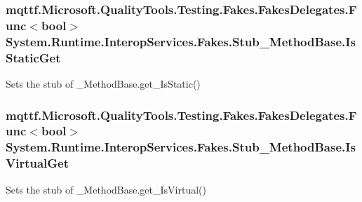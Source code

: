 \hypertarget{class_system_1_1_runtime_1_1_interop_services_1_1_fakes_1_1_stub___method_base_a9942d1453cbd6e098362d18e13d050f5}{
\subsubsection[{Is\-Static\-Get}]{\setlength{\rightskip}{0pt plus 5cm}mqttf.\-Microsoft.\-Quality\-Tools.\-Testing.\-Fakes.\-Fakes\-Delegates.\-Func$<$bool$>$ System.\-Runtime.\-Interop\-Services.\-Fakes.\-Stub\-\_\-\-Method\-Base.\-Is\-Static\-Get}}\label{class_system_1_1_runtime_1_1_interop_services_1_1_fakes_1_1_stub___method_base_a9942d1453cbd6e098362d18e13d050f5}


Sets the stub of \-\_\-\-Method\-Base.\-get\-\_\-\-Is\-Static()

\hypertarget{class_system_1_1_runtime_1_1_interop_services_1_1_fakes_1_1_stub___method_base_a7eb863eb321fd42222014dd6570e71dd}{
\subsubsection[{Is\-Virtual\-Get}]{\setlength{\rightskip}{0pt plus 5cm}mqttf.\-Microsoft.\-Quality\-Tools.\-Testing.\-Fakes.\-Fakes\-Delegates.\-Func$<$bool$>$ System.\-Runtime.\-Interop\-Services.\-Fakes.\-Stub\-\_\-\-Method\-Base.\-Is\-Virtual\-Get}}\label{class_system_1_1_runtime_1_1_interop_services_1_1_fakes_1_1_stub___method_base_a7eb863eb321fd42222014dd6570e71dd}


Sets the stub of \-\_\-\-Method\-Base.\-get\-\_\-\-Is\-Virtual()

